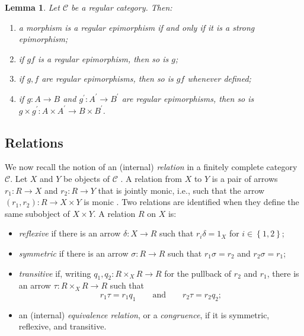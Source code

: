 \documentclass[12pt]{amsart}
\newtheorem{lemma}[theorem]{Lemma}
\theoremstyle{definition}
\begin{document}
\begin{lemma}
\label{Lemma:regular} Let $\mathcal{C}$ be a regular category. Then:

\begin{enumerate}
\item a morphism is a regular epimorphism if and only if it is a strong
epimorphism;

\item if $gf$ is a regular epimorphism, then so is $g$;

\item if $g,f$ are regular epimorphisms, then so is $gf$ whenever defined;

\item if $g:A\rightarrow B$ and $g^{\prime }:A^{\prime }\rightarrow
B^{\prime }$ are regular epimorphisms, then so is $g\times g^{\prime
}:A\times A^{\prime }\rightarrow B\times B^{\prime }$.
\end{enumerate}
\end{lemma}

\subsection{Relations}

We now recall the notion of an (internal) \emph{relation} in a finitely
complete category $\mathcal{C}$. Let $X$ and $Y$ be objects of $\mathcal{C}$%
. A relation from $X$ to $Y$ is a pair of arrows $r_{1}:R\rightarrow X$ and $%
r_{2}:R\rightarrow Y$ that is jointly monic, i.e., such that the arrow $%
\left( r_{1},r_{2}\right) :R\rightarrow X\times Y$ is monic \cite[Definition
2.1]{gran_introduction_2021}. Two relations are identified when they define
the same subobject of $X\times Y$. A relation $R$ on $X$ is:

\begin{itemize}
\item \emph{reflexive} if there is an arrow $\delta :X\rightarrow R$ such
that $r_{i}\delta =1_{X}$ for $i\in \left\{ 1,2\right\} $;

\item \emph{symmetric} if there is an arrow $\sigma :R\rightarrow R$ such
that $r_{1}\sigma =r_{2}$ and $r_{2}\sigma =r_{1}$;

\item \emph{transitive} if, writing $q_{1},q_{2}:R\times_{X}R\rightarrow R$
for the pullback of $r_{2}$ and $r_{1}$, there is an arrow $%
\tau:R\times_{X}R\rightarrow R$ such that 
\begin{equation*}
r_{1}\tau=r_{1}q_{1}\qquad\text{and}\qquad r_{2}\tau=r_{2}q_{2};
\end{equation*}

\item an (internal) \emph{equivalence relation}, or a \emph{congruence}, if
it is symmetric, reflexive, and transitive.
\end{itemize}
\end{document}
